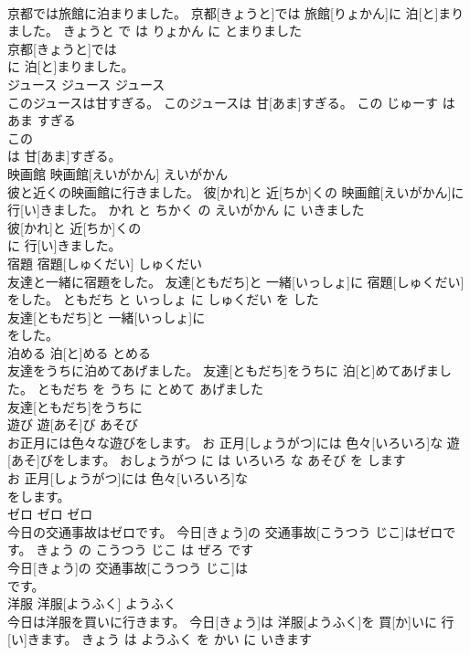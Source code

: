 \documentclass[8pt]{extreport}
\begin{document}
\begin{CJK}{UTF8}{min}
\\	京都では旅館に泊まりました。	京都[きょうと]では 旅館[りょかん]に 泊[と]まりました。	きょうと で は りょかん に とまりました	
\\	京都[きょうと]では
\\	に 泊[と]まりました。			
\\	ジュース	ジュース	ジュース	
\\	このジュースは甘すぎる。	このジュースは 甘[あま]すぎる。	この じゅーす は あま すぎる	
\\	この
\\	は 甘[あま]すぎる。			
\\	映画館	映画館[えいがかん]	えいがかん	
\\	彼と近くの映画館に行きました。	彼[かれ]と 近[ちか]くの 映画館[えいがかん]に 行[い]きました。	かれ と ちかく の えいがかん に いきました	
\\	彼[かれ]と 近[ちか]くの
\\	に 行[い]きました。			
\\	宿題	宿題[しゅくだい]	しゅくだい	
\\	友達と一緒に宿題をした。	友達[ともだち]と 一緒[いっしょ]に 宿題[しゅくだい]をした。	ともだち と いっしょ に しゅくだい を した	
\\	友達[ともだち]と 一緒[いっしょ]に
\\	をした。			
\\	泊める	泊[と]める	とめる	
\\	友達をうちに泊めてあげました。	友達[ともだち]をうちに 泊[と]めてあげました。	ともだち を うち に とめて あげました	
\\	友達[ともだち]をうちに
\\	遊び	遊[あそ]び	あそび	
\\	お正月には色々な遊びをします。	お 正月[しょうがつ]には 色々[いろいろ]な 遊[あそ]びをします。	おしょうがつ に は いろいろ な あそび を します	
\\	お 正月[しょうがつ]には 色々[いろいろ]な
\\	をします。			
\\	ゼロ	ゼロ	ゼロ	
\\	今日の交通事故はゼロです。	今日[きょう]の 交通事故[こうつう じこ]はゼロです。	きょう の こうつう じこ は ぜろ です	
\\	今日[きょう]の 交通事故[こうつう じこ]は
\\	です。			
\\	洋服	洋服[ようふく]	ようふく	
\\	今日は洋服を買いに行きます。	今日[きょう]は 洋服[ようふく]を 買[か]いに 行[い]きます。	きょう は ようふく を かい に いきます	

\end{CJK}
\end{document}
